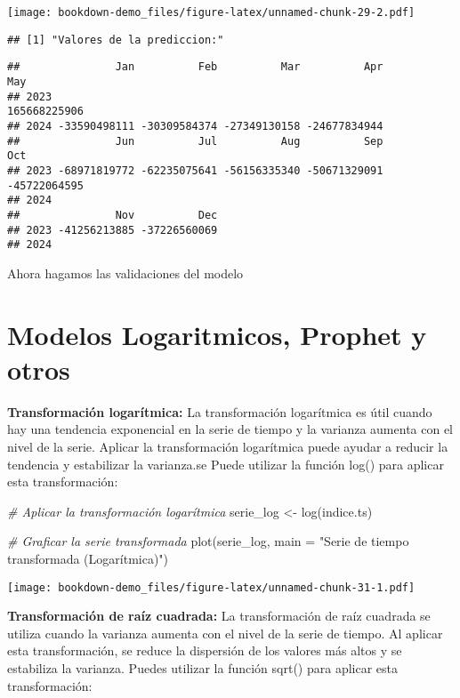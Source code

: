 \documentclass[
]{book}
\newenvironment{Shaded}{\begin{snugshade}}{\end{snugshade}}
\newcommand{\AttributeTok}[1]{\textcolor[rgb]{0.77,0.63,0.00}{#1}}
\newcommand{\CommentTok}[1]{\textcolor[rgb]{0.56,0.35,0.01}{\textit{#1}}}
\newcommand{\FunctionTok}[1]{\textcolor[rgb]{0.00,0.00,0.00}{#1}}
\newcommand{\NormalTok}[1]{#1}
\newcommand{\OtherTok}[1]{\textcolor[rgb]{0.56,0.35,0.01}{#1}}
\newcommand{\StringTok}[1]{\textcolor[rgb]{0.31,0.60,0.02}{#1}}
\begin{document}
\texttt{[image: bookdown-demo\_files/figure-latex/unnamed-chunk-29-2.pdf]}

\begin{verbatim}
## [1] "Valores de la prediccion:"
\end{verbatim}

\begin{verbatim}
##               Jan          Feb          Mar          Apr          May
## 2023                                                     165668225906
## 2024 -33590498111 -30309584374 -27349130158 -24677834944             
##               Jun          Jul          Aug          Sep          Oct
## 2023 -68971819772 -62235075641 -56156335340 -50671329091 -45722064595
## 2024                                                                 
##               Nov          Dec
## 2023 -41256213885 -37226560069
## 2024
\end{verbatim}

Ahora hagamos las validaciones del modelo

\hypertarget{modelos-logaritmicos-prophet-y-otros}{%
\chapter{Modelos Logaritmicos, Prophet y otros}\label{modelos-logaritmicos-prophet-y-otros}}

\textbf{Transformación logarítmica:}
La transformación logarítmica es útil cuando hay una tendencia exponencial en la serie de tiempo y la varianza aumenta con el nivel de la serie. Aplicar la transformación logarítmica puede ayudar a reducir la tendencia y estabilizar la varianza.se Puede utilizar la función log() para aplicar esta transformación:

\begin{Shaded}
\begin{Highlighting}[]
\CommentTok{\# Aplicar la transformación logarítmica}
\NormalTok{serie\_log }\OtherTok{\textless{}{-}} \FunctionTok{log}\NormalTok{(indice.ts)}

\CommentTok{\# Graficar la serie transformada}
\FunctionTok{plot}\NormalTok{(serie\_log, }\AttributeTok{main =} \StringTok{"Serie de tiempo transformada (Logarítmica)"}\NormalTok{)}
\end{Highlighting}
\end{Shaded}

\texttt{[image: bookdown-demo\_files/figure-latex/unnamed-chunk-31-1.pdf]}

\textbf{Transformación de raíz cuadrada:}
La transformación de raíz cuadrada se utiliza cuando la varianza aumenta con el nivel de la serie de tiempo. Al aplicar esta transformación, se reduce la dispersión de los valores más altos y se estabiliza la varianza. Puedes utilizar la función sqrt() para aplicar esta transformación:
\end{document}
